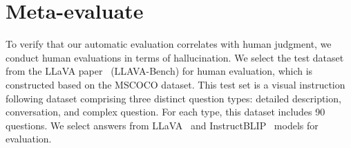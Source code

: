\section{Meta-evaluate \ours\ }
\label{sec:meta}




To verify that our automatic evaluation correlates with human judgment, 
we conduct human evaluations in terms of hallucination. We select the test dataset from the LLaVA paper~\cite{llava}  (LLAVA-Bench) for human evaluation, which is constructed based on the MSCOCO dataset.  
This test set is a visual instruction following dataset comprising three distinct question types: detailed description, conversation, and complex question. For each type, this dataset includes 90 questions. We select answers from  LLaVA~\cite{llava} and InstructBLIP~\cite{InstructBLIP} models for evaluation. 




